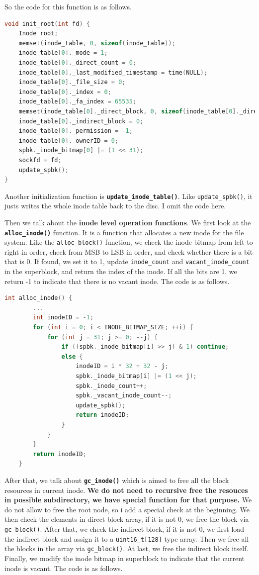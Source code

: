 So the code for this function is as follows.

\begin{lstlisting}[language=C]
void init_root(int fd) {
    Inode root;
    memset(inode_table, 0, sizeof(inode_table));
    inode_table[0]._mode = 1;
    inode_table[0]._direct_count = 0;
    inode_table[0]._last_modified_timestamp = time(NULL);
    inode_table[0]._file_size = 0;
    inode_table[0]._index = 0;
    inode_table[0]._fa_index = 65535;
    memset(inode_table[0]._direct_block, 0, sizeof(inode_table[0]._direct_block));
    inode_table[0]._indirect_block = 0;
    inode_table[0]._permission = -1;
    inode_table[0]._ownerID = 0;
    spbk._inode_bitmap[0] |= (1 << 31);
    sockfd = fd;
    update_spbk();
}
\end{lstlisting}

Another initialization function is \textbf{\texttt{update_inode_table()}}. Like \texttt{update\_spbk()}, it  
justs writes the whole inode table back to the disc. I omit the code here.

Then we talk about the \textbf{inode level operation functions}. We first look at the \textbf{\texttt{alloc\_inode()}} function. It is a function that allocates a new inode for the file system.
Like the \texttt{alloc\_block()} function, we check the inode bitmap from left to right in order, check from MSB to LSB in order, and check whether there is a bit that is 0. If found, we set it to 1, update \texttt{inode\_count} and \texttt{vacant\_inode\_count} in the superblock, and return the index of the inode.
If all the bits are 1, we return -1 to indicate that there is no vacant inode. The code is as follows.

\begin{lstlisting}[language=C]
    int alloc_inode() {
        ...
        int inodeID = -1;
        for (int i = 0; i < INODE_BITMAP_SIZE; ++i) {
            for (int j = 31; j >= 0; --j) {
                if ((spbk._inode_bitmap[i] >> j) & 1) continue;
                else {
                    inodeID = i * 32 + 32 - j;
                    spbk._inode_bitmap[i] |= (1 << j);
                    spbk._inode_count++;
                    spbk._vacant_inode_count--;
                    update_spbk();
                    return inodeID;
                }
            }
        }
        return inodeID;
    }    
\end{lstlisting}

After that, we talk about \textbf{\texttt{gc_inode()}} which is aimed to free all the block resources in current inode. \textbf{We 
do not need to recursive free the resouces in possible subdirectory, we have special function for that purpose.}
We do not allow to free the root node, so i add a special check at the beginning. 
We then check the elements in direct block array, if it is not 0, we free the block via \texttt{gc\_block()}.
After that, we check the indirect block, if it is not 0, we first load the indirect block and assign it to a \texttt{uint16_t[128]} type 
array. Then we free all the blocks in the array via \texttt{gc\_block()}. At last, we free the indirect block itself.
Finally, we modify the inode bitmap in superblock to indicate that the current inode is vacant. The code is as follows.

